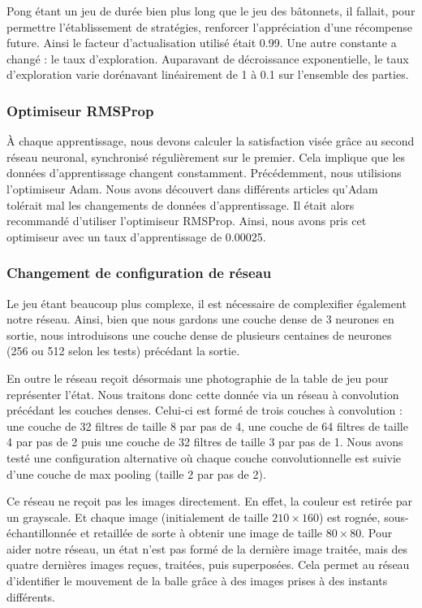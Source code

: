 Pong étant un jeu de durée bien plus long que le jeu des bâtonnets, il fallait, pour permettre l'établissement de stratégies, renforcer l'appréciation d'une
récompense future. Ainsi le facteur d'actualisation utilisé était 0.99. Une autre constante a changé : le taux d'exploration. Auparavant de décroissance exponentielle,
le taux d'exploration varie dorénavant linéairement de 1 à 0.1 sur l'ensemble des parties.

\subsubsection{Optimiseur RMSProp}

À chaque apprentissage, nous devons calculer la satisfaction visée grâce au second réseau neuronal, synchronisé régulièrement sur le premier. Cela implique
que les données d'apprentissage changent constamment. Précédemment, nous utilisions l'optimiseur Adam. Nous avons découvert dans différents articles qu'Adam tolérait
mal les changements de données d'apprentissage. Il était alors recommandé d'utiliser l'optimiseur RMSProp. Ainsi, nous avons pris cet optimiseur avec un 
taux d'apprentissage de 0.00025.

\subsubsection{Changement de configuration de réseau}

Le jeu étant beaucoup plus complexe, il est nécessaire de complexifier également notre réseau. Ainsi, bien que nous gardons une couche dense de 3 neurones en sortie,
nous introduisons une couche dense de plusieurs centaines de neurones (256 ou 512 selon les tests) précédant la sortie. 

En outre le réseau reçoit désormais une photographie de la table de jeu pour représenter l'état. Nous traitons donc cette donnée via un réseau à convolution précédant
les couches denses. Celui-ci est formé de trois couches à convolution : une couche de 32 filtres de taille 8 par pas de 4, une couche de 64 filtres de taille 4 par pas
de 2 puis une couche de 32 filtres de taille 3 par pas de 1. Nous avons testé une configuration alternative où chaque couche convolutionnelle est suivie d'une
couche de max pooling (taille 2 par pas de 2).

Ce réseau ne reçoit pas les images directement. En effet, la couleur est retirée par un grayscale. Et chaque image (initialement de taille $210 \times 160$) est rognée,
sous-échantillonnée et retaillée de sorte à obtenir une image de taille $80 \times 80$. Pour aider notre réseau, un état n'est pas formé de la dernière image traitée, mais
des quatre dernières images reçues, traitées, puis superposées. Cela permet au réseau d'identifier le mouvement de la balle grâce à des images prises à des instants
différents.

